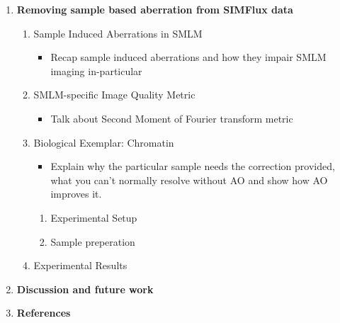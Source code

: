 \documentclass[twoside,onecolumn]{article}
\begin{document}
\begin{enumerate}[label*=\arabic*.]
	\item \textbf{Removing sample based aberration from SIMFlux data}
	\begin{enumerate}[label*=\arabic*.]
		\item Sample Induced Aberrations in SMLM
		\begin{itemize}
			\item Recap sample induced aberrations and how they impair SMLM imaging in-particular
		\end{itemize}
		\item SMLM-specific Image Quality Metric
		\begin{itemize}
			\item Talk about Second Moment of Fourier transform metric
		\end{itemize}
		\item Biological Exemplar: Chromatin
		\begin{itemize}
			\item Explain why the particular sample needs the correction provided, what you can't normally resolve without AO and show how  AO improves it.
		\end{itemize}
		\begin{enumerate}[label*=\arabic*.]
			\item Experimental Setup
			\item Sample preperation
		\end{enumerate}
		\item Experimental Results
	\end{enumerate}
	\item \textbf{Discussion and future work}
	\item \textbf{References}
\end{enumerate}
\newpage


\printbibliography

\end{document}

